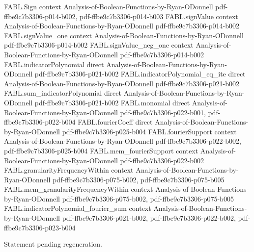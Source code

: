 \begin{theorem}
\label{FABL.fourier_expansion_from_interpolation}
\leanok
{}
\proofstep
  {FABL.Sign}
  {context}
  {Analysis-of-Boolean-Functions-by-Ryan-ODonnell}
  {pdf-ffbe9c7b3306-p014-b002,
    pdf-ffbe9c7b3306-p014-b003}
\proofstep
  {FABL.signValue}
  {context}
  {Analysis-of-Boolean-Functions-by-Ryan-ODonnell}
  {pdf-ffbe9c7b3306-p014-b002}
\proofstep
  {FABL.signValue_one}
  {context}
  {Analysis-of-Boolean-Functions-by-Ryan-ODonnell}
  {pdf-ffbe9c7b3306-p014-b002}
\proofstep
  {FABL.signValue_neg_one}
  {context}
  {Analysis-of-Boolean-Functions-by-Ryan-ODonnell}
  {pdf-ffbe9c7b3306-p014-b002}
\proofstep
  {FABL.indicatorPolynomial}
  {direct}
  {Analysis-of-Boolean-Functions-by-Ryan-ODonnell}
  {pdf-ffbe9c7b3306-p021-b002}
\proofstep
  {FABL.indicatorPolynomial_eq_ite}
  {direct}
  {Analysis-of-Boolean-Functions-by-Ryan-ODonnell}
  {pdf-ffbe9c7b3306-p021-b002}
\proofstep
  {FABL.sum_indicatorPolynomial}
  {direct}
  {Analysis-of-Boolean-Functions-by-Ryan-ODonnell}
  {pdf-ffbe9c7b3306-p021-b002}
\proofstep
  {FABL.monomial}
  {direct}
  {Analysis-of-Boolean-Functions-by-Ryan-ODonnell}
  {pdf-ffbe9c7b3306-p022-b001,
    pdf-ffbe9c7b3306-p022-b004}
\proofstep
  {FABL.fourierCoeff}
  {direct}
  {Analysis-of-Boolean-Functions-by-Ryan-ODonnell}
  {pdf-ffbe9c7b3306-p025-b004}
\proofstep
  {FABL.fourierSupport}
  {context}
  {Analysis-of-Boolean-Functions-by-Ryan-ODonnell}
  {pdf-ffbe9c7b3306-p022-b002,
    pdf-ffbe9c7b3306-p025-b004}
\proofstep
  {FABL.mem_fourierSupport}
  {context}
  {Analysis-of-Boolean-Functions-by-Ryan-ODonnell}
  {pdf-ffbe9c7b3306-p022-b002}
\proofstep
  {FABL.granularityFrequencyWithin}
  {context}
  {Analysis-of-Boolean-Functions-by-Ryan-ODonnell}
  {pdf-ffbe9c7b3306-p075-b002,
    pdf-ffbe9c7b3306-p075-b005}
\proofstep
  {FABL.mem_granularityFrequencyWithin}
  {context}
  {Analysis-of-Boolean-Functions-by-Ryan-ODonnell}
  {pdf-ffbe9c7b3306-p075-b002,
    pdf-ffbe9c7b3306-p075-b005}
\proofstep
  {FABL.indicatorPolynomial_fourier_sum}
  {context}
  {Analysis-of-Boolean-Functions-by-Ryan-ODonnell}
  {pdf-ffbe9c7b3306-p021-b002,
    pdf-ffbe9c7b3306-p022-b002,
    pdf-ffbe9c7b3306-p023-b004}

Statement pending regeneration.
\end{theorem}

